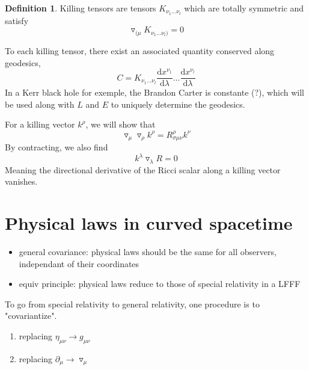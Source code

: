 \documentclass[a4paper]{book}
\theoremstyle{definition}
\newtheorem{definition}{Definition}[section]
\theoremstyle{remark}
\begin{document}
\begin{definition}
    Killing tensors are tensors $K_{\nu_1\dots \nu_l}$ which are totally symmetric and satisfy 
    \begin{equation}
        \triangledown_{(\mu} K_{\nu_1\dots \nu_l)} = 0
    \end{equation}
\end{definition}
To each killing tensor, there exist an associated quantity conserved along geodesics, 
\begin{equation}
    C = K_{\nu_1\dots \nu_l} \frac{\text{d}x^{\nu_1}}{\text{d}\lambda} \dots \frac{\text{d}x^{\nu_l}}{\text{d}\lambda}
\end{equation}
In a Kerr black hole for exemple, the Brandon Carter is constante (?), which will be used along with $L$ and $E$ to uniquely determine the geodesics. \par \medskip 

For a killing vector $k^\rho$, we will show that 
\begin{equation}
    \triangledown_\mu \triangledown_\rho k^\rho = R^\rho_{\sigma\mu\nu}k^\nu 
\end{equation}
By contracting, we also find 
\begin{equation}
    k^\lambda \triangledown_\lambda R = 0
\end{equation}
Meaning the directional derivative of the Ricci scalar along a killing vector vanishes. 

\chapter{Physical laws in curved spacetime}

\begin{itemize}
    \item general covariance: physical laws should be the same for all observers, independant of their coordinates
    \item equiv principle: physical laws reduce to those of special relativity in a LFFF 
\end{itemize}

To go from special relativity to general relativity, one procedure is to "covariantize". 
\begin{enumerate}
    \item replacing $\eta_{\mu\nu} \rightarrow g_{\mu\nu}$
    \item replacing $\partial_\mu \rightarrow \triangledown_\mu$
\end{enumerate}
\end{document}
